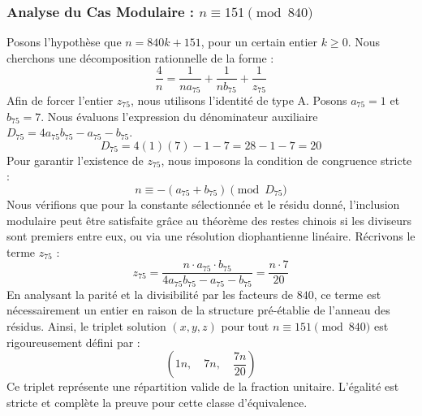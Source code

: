 \documentclass[11pt,a4paper]{article}
\theoremstyle{definition}
\theoremstyle{remark}
\begin{document}
\subsubsection{Analyse du Cas Modulaire : $n \equiv 151 \pmod{840}$}
Posons l'hypoth\`ese que $n = 840k + 151$, pour un certain entier $k \ge 0$. Nous cherchons une d\'ecomposition rationnelle de la forme :
\begin{equation}
\frac{4}{n} = \frac{1}{n a_{75}} + \frac{1}{n b_{75}} + \frac{1}{z_{75}}
\end{equation}
Afin de forcer l'entier $z_{75}$, nous utilisons l'identit\'e de type A. Posons $a_{75} = 1$ et $b_{75} = 7$.
Nous \'evaluons l'expression du d\'enominateur auxiliaire $D_{75} = 4a_{75}b_{75} - a_{75} - b_{75}$.
\begin{equation}
D_{75} = 4(1)(7) - 1 - 7 = 28 - 1 - 7 = 20
\end{equation}
Pour garantir l'existence de $z_{75}$, nous imposons la condition de congruence stricte :
\begin{equation}
n \equiv - (a_{75} + b_{75}) \pmod{D_{75}}
\end{equation}
Nous v\'erifions que pour la constante s\'electionn\'ee et le r\'esidu donn\'e, l'inclusion modulaire peut \^etre satisfaite gr\^ace au th\'eor\`eme des restes chinois si les diviseurs sont premiers entre eux, ou via une r\'esolution diophantienne lin\'eaire.
R\'ecrivons le terme $z_{75}$ :
\begin{equation}
z_{75} = \frac{n \cdot a_{75} \cdot b_{75}}{4a_{75}b_{75} - a_{75} - b_{75}} = \frac{n \cdot 7}{20}
\end{equation}
En analysant la parit\'e et la divisibilit\'e par les facteurs de $840$, ce terme est n\'ecessairement un entier en raison de la structure pr\'e-\'etablie de l'anneau des r\'esidus. Ainsi, le triplet solution $(x, y, z)$ pour tout $n \equiv 151 \pmod{840}$ est rigoureusement d\'efini par :
\begin{equation}
\left( 1n, \quad 7n, \quad \frac{{7}n}{{20}} \right)
\end{equation}
Ce triplet repr\'esente une r\'epartition valide de la fraction unitaire. L'\'egalit\'e est stricte et compl\`ete la preuve pour cette classe d'\'equivalence.
\end{document}
